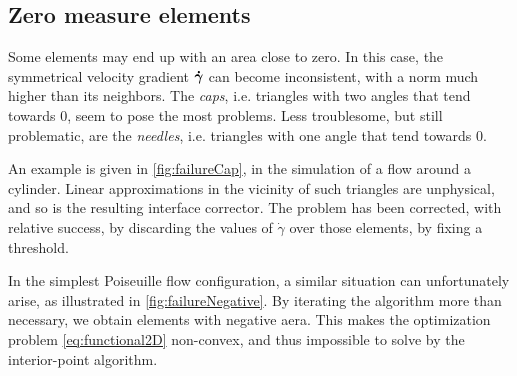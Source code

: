 \documentclass[11 pt]{report}
\begin{document}
\subsection{Zero measure elements}
Some elements may end up with an area close to zero. In this case, the symmetrical velocity gradient $\boldsymbol{\dot \gamma}$ can become inconsistent, with a norm much higher than its neighbors. The \textit{caps}, i.e. triangles with two angles that tend towards $0$, seem to pose the most problems. Less troublesome, but still problematic, are the \textit{needles}, i.e. triangles with one angle that tend towards $0$. 

An example is given in \cref{fig:failureCap}, in the simulation of a flow around a cylinder. Linear approximations in the vicinity of such triangles are unphysical, and so is the resulting interface corrector. The problem has been corrected, with relative success, by discarding the values of $\dot \gamma$ over those elements, by fixing a threshold.

In the simplest Poiseuille flow configuration, a similar situation can unfortunately arise, as illustrated in \cref{fig:failureNegative}. By iterating the algorithm more than necessary, we obtain elements with negative aera. This makes the optimization problem \eqref{eq:functional2D} non-convex, and thus impossible to solve by the interior-point algorithm.
\end{document}
